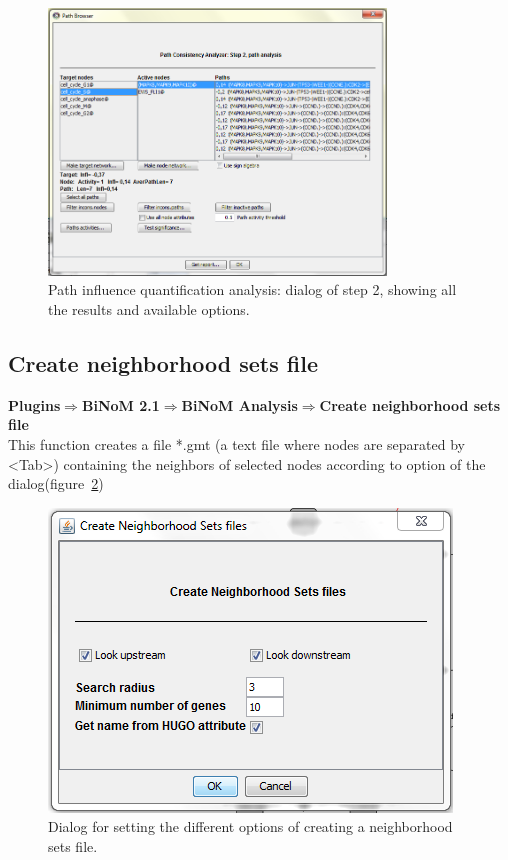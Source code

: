 \begin{figure}
  \centering
  \includegraphics[width=0.8\textwidth]{graphics/Path_consistency_analyser_Dialog2}
  \caption{Path influence quantification analysis: dialog of step 2, showing all the results and available options.}
  \label{Path_consistency_analyser_Dialog2}
\end{figure}  


\subsection{Create neighborhood sets file}
\textbf{Plugins$\Rightarrow$BiNoM 2.1$\Rightarrow$BiNoM Analysis$\Rightarrow$Create neighborhood sets file}\\
This function creates a file *.gmt (a text file where nodes are separated by \textless Tab\textgreater) containing the neighbors of selected nodes according to option of the dialog(figure~\ref{Create_Neigborhood_File_Dialog})
\begin{figure}
\centering
\includegraphics[width=7 cm]{graphics/Create_Neigborhood_File_Dialog}
\caption{Dialog for setting the different options of creating a neighborhood sets file.}
\label{Create_Neigborhood_File_Dialog}
\end{figure}  
